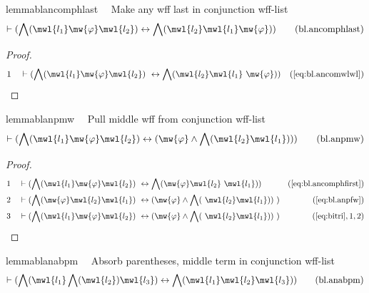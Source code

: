 \begin{restatable}{lemma}{blancomphlast}~~ Make any wff last in conjunction
wff-list
\begin{align}
\vdash ( \bigwedge( \mwl{l_1} \mw{\varphi} \mwl{l_2} ) \leftrightarrow
    \bigwedge( \mwl{l_2} \mwl{l_1} \mw{\varphi} )
    )\label{eq:bl.ancomphlast}\tag{bl.ancomphlast}
\end{align}
\end{restatable}

\begin{proof}
\begin{align}
  1 &&  & \vdash ( \bigwedge( \mwl{l_1} \mw{\varphi} \mwl{l_2} )
     ~\leftrightarrow \bigwedge( \mwl{l_2} \mwl{l_1}
     ~\mw{\varphi} ) )&(\mbox{\ref{eq:bl.ancomwlwl}})\notag
\end{align}
\end{proof}

\begin{restatable}{lemma}{blanpmw}~~ Pull middle wff from conjunction wff-list
\begin{align}
\vdash ( \bigwedge( \mwl{l_1} \mw{\varphi} \mwl{l_2} ) \leftrightarrow (
    \mw{\varphi} \wedge \bigwedge( \mwl{l_2} \mwl{l_1} ) )
    )\label{eq:bl.anpmw}\tag{bl.anpmw}
\end{align}
\end{restatable}

\begin{proof}
\begin{align}
  1 &&  & \vdash ( \bigwedge( \mwl{l_1} \mw{\varphi} \mwl{l_2} )
     ~\leftrightarrow \bigwedge( \mw{\varphi} \mwl{l_2}
     ~\mwl{l_1} ) )&(\mbox{\ref{eq:bl.ancomphfirst}})\notag
  \\ 2 &&  & \vdash ( \bigwedge( \mw{\varphi} \mwl{l_2} \mwl{l_1} )
     ~\leftrightarrow ( \mw{\varphi} \wedge \bigwedge(
     ~\mwl{l_2} \mwl{l_1} ) )
     ~)&(\mbox{\ref{eq:bl.anpfw}})\notag
  \\ 3 &&  & \vdash ( \bigwedge( \mwl{l_1} \mw{\varphi} \mwl{l_2} )
     ~\leftrightarrow ( \mw{\varphi} \wedge \bigwedge(
     ~\mwl{l_2} \mwl{l_1} ) )
     ~)&(\mbox{\ref{eq:bitri}},1,2)\notag
\end{align}
\end{proof}

\begin{restatable}{lemma}{blanabpm}~~ Absorb parentheses, middle term in
conjunction wff-list
\begin{align}
\vdash ( \bigwedge( \mwl{l_1} \bigwedge( \mwl{l_2} ) \mwl{l_3} )
    \leftrightarrow \bigwedge( \mwl{l_1} \mwl{l_2} \mwl{l_3} )
    )\label{eq:bl.anabpm}\tag{bl.anabpm}
\end{align}
\end{restatable}

